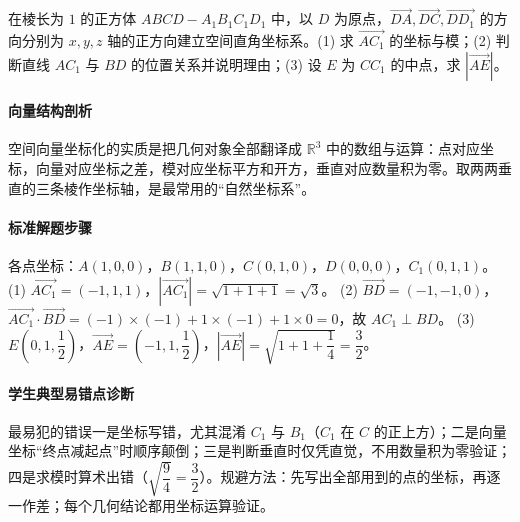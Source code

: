 \begin{problem}
在棱长为 $1$ 的正方体 $ABCD-A_1B_1C_1D_1$ 中，以 $D$ 为原点，$\overrightarrow{DA},\overrightarrow{DC},\overrightarrow{DD_1}$ 的方向分别为 $x,y,z$ 轴的正方向建立空间直角坐标系。(1) 求 $\overrightarrow{AC_1}$ 的坐标与模；(2) 判断直线 $AC_1$ 与 $BD$ 的位置关系并说明理由；(3) 设 $E$ 为 $CC_1$ 的中点，求 $|\overrightarrow{AE}|$。
\end{problem}
\begin{solution}
\paragraph{向量结构剖析}
空间向量坐标化的实质是把几何对象全部翻译成 $\mathbb R^3$ 中的数组与运算：点对应坐标，向量对应坐标之差，模对应坐标平方和开方，垂直对应数量积为零。取两两垂直的三条棱作坐标轴，是最常用的“自然坐标系”。
\paragraph{标准解题步骤}
各点坐标：$A(1,0,0)$，$B(1,1,0)$，$C(0,1,0)$，$D(0,0,0)$，$C_1(0,1,1)$。
(1) $\overrightarrow{AC_1}=(-1,1,1)$，$|\overrightarrow{AC_1}|=\sqrt{1+1+1}=\sqrt3$。
(2) $\overrightarrow{BD}=(-1,-1,0)$，$\overrightarrow{AC_1}\cdot\overrightarrow{BD}=(-1)\times(-1)+1\times(-1)+1\times0=0$，故 $AC_1\perp BD$。
(3) $E\left(0,1,\dfrac12\right)$，$\overrightarrow{AE}=\left(-1,1,\dfrac12\right)$，$|\overrightarrow{AE}|=\sqrt{1+1+\dfrac14}=\dfrac32$。
\paragraph{学生典型易错点诊断}
最易犯的错误一是坐标写错，尤其混淆 $C_1$ 与 $B_1$（$C_1$ 在 $C$ 的正上方）；二是向量坐标“终点减起点”时顺序颠倒；三是判断垂直时仅凭直觉，不用数量积为零验证；四是求模时算术出错（$\sqrt{\dfrac94}=\dfrac32$）。规避方法：先写出全部用到的点的坐标，再逐一作差；每个几何结论都用坐标运算验证。
\end{solution}

